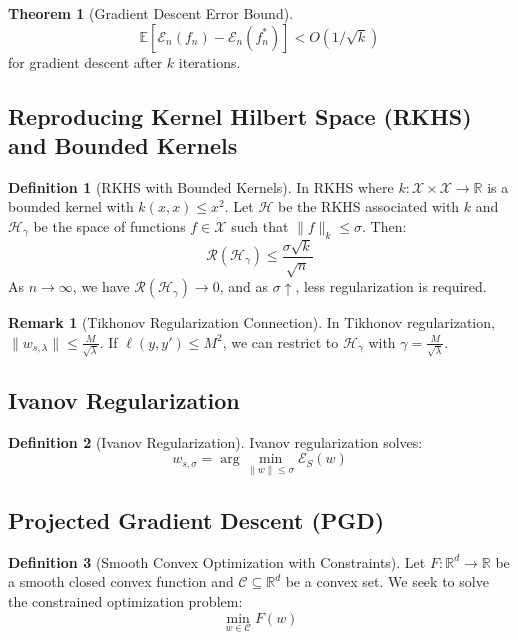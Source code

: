 \documentclass[12pt,a4paper]{article}
\theoremstyle{definition}
\newtheorem{definition}{Definition}[section]
\newtheorem{theorem}{Theorem}[section]
\newtheorem{remark}{Remark}[section]
\begin{document}
\begin{theorem}[Gradient Descent Error Bound]
\[
\mathbb{E}[\mathcal{E}_n(f_n) - \mathcal{E}_n(f_n^*)] < O(1/\sqrt{k})
\]
for gradient descent after $k$ iterations.
\end{theorem}

\subsection{Reproducing Kernel Hilbert Space (RKHS) and Bounded Kernels}

\begin{definition}[RKHS with Bounded Kernels]
In RKHS where $k: \mathcal{X} \times \mathcal{X} \to \mathbb{R}$ is a bounded kernel with $k(x,x) \leq x^2$. Let $\mathcal{H}$ be the RKHS associated with $k$ and $\mathcal{H}_\gamma$ be the space of functions $f \in \mathcal{X}$ such that $\|f\|_k \leq \sigma$. Then:
\[
\mathcal{R}(\mathcal{H}_\gamma) \leq \frac{\sigma\sqrt{k}}{\sqrt{n}}
\]
As $n \to \infty$, we have $\mathcal{R}(\mathcal{H}_\gamma) \to 0$, and as $\sigma \uparrow$, less regularization is required.
\end{definition}

\begin{remark}[Tikhonov Regularization Connection]
In Tikhonov regularization, $\|w_{s,\lambda}\| \leq \frac{M}{\sqrt{\lambda}}$. If $\ell(y, y') \leq M^2$, we can restrict to $\mathcal{H}_\gamma$ with $\gamma = \frac{M}{\sqrt{\lambda}}$.
\end{remark}

\subsection{Ivanov Regularization}

\begin{definition}[Ivanov Regularization]
Ivanov regularization solves:
\[
w_{s,\sigma} = \arg\min_{\|w\| \leq \sigma} \mathcal{E}_S(w)
\]
\end{definition}

\subsection{Projected Gradient Descent (PGD)}

\begin{definition}[Smooth Convex Optimization with Constraints]
Let $F: \mathbb{R}^d \to \mathbb{R}$ be a smooth closed convex function and $\mathcal{C} \subseteq \mathbb{R}^d$ be a convex set. We seek to solve the constrained optimization problem:
\[
\min_{w \in \mathcal{C}} F(w)
\]
\end{definition}
\end{document}
